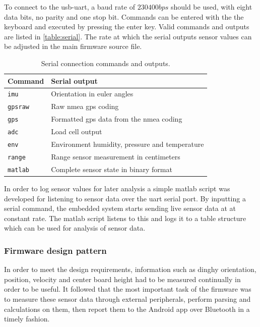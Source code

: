 To connect to the \gls{usb}-\gls{uart}, a baud rate of $230400bps$ should be used, with eight data bits, no parity and one stop bit. Commands can be entered with the the keyboard and executed by pressing the enter key. Valid commands and outputs are listed in \autoref{table:serial}. The rate at which the serial outputs sensor values can be adjusted in the main firmware source file.

\begin{table}[H]
\centering
\begin{tabular}{ l | l }
 	Command 		& Serial output \\
  	\hline
  	\texttt{imu} 		& Orientation in euler angles \\
  	\texttt{gpsraw} 	& Raw \gls{nmea} \gls{gps} coding\\
  	\texttt{gps} 		& Formatted \gls{gps} data from the \gls{nmea} coding\\
  	\texttt{adc} 		& Load cell output\\
  	\texttt{env} 		& Environment humidity, pressure and temperature \\
  	\texttt{range} 	& Range sensor measurement in centimeters \\
  	\texttt{matlab} 	& Complete sensor state in binary format \\
\end{tabular}
\caption{Serial connection commands and outputs.}
\label{table:serial}
\end{table}

In order to log sensor values for later analysis a simple \gls{matlab} script was developed for listening to sensor data over the \gls{uart} serial port. By inputting a serial command, the embedded system starts sending live sensor data at at constant rate. The \gls{matlab} script listens to this and logs it to a table structure which can be used for analysis of sensor data.

\subsubsection{Firmware design pattern}
In order to meet the design requirements, information such as dinghy orientation, position, velocity and center board height had to be measured continually in order to be useful. It followed that the most important task of the firmware was to measure these sensor data through external peripherals, perform parsing and calculations on them, then report them to the Android app over Bluetooth in a timely fashion. 


